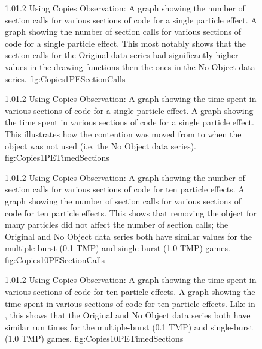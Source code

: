\begin{figure}
\addtocounter{figure}{-1}

	\vspace{-1.5cm}
	{1.0}{1.2}
	{Using Copies Observation: A graph showing the number of section calls for various sections of code for a single particle effect.}
	{A graph showing the number of section calls for various sections of code for a single particle effect. This most notably shows that the section calls for the Original data series had significantly higher values in the drawing functions then the ones in the No Object data series.}
	{fig:Copies1PESectionCalls}

	{1.0}{1.2}
	{Using Copies Observation: A graph showing the time spent in various sections of code for a single particle effect.}
	{A graph showing the time spent in various sections of code for a single particle effect. This illustrates how the contention was moved from  to  when the  object was not used (i.e. the No Object data series).}
	{fig:Copies1PETimedSections}

\end{figure}

\begin{figure}
\addtocounter{figure}{-1}

	\vspace{-1.5cm}
	{1.0}{1.2}
	{Using Copies Observation: A graph showing the number of section calls for various sections of code for ten particle effects.}
	{A graph showing the number of section calls for various sections of code for ten particle effects. This shows that removing the  object for many particles did not affect the number of section calls; the Original and No Object data series both have similar values for the multiple-burst (0.1 TMP) and single-burst (1.0 TMP) games.}
	{fig:Copies10PESectionCalls}

	{1.0}{1.2}
	{Using Copies Observation: A graph showing the time spent in various sections of code for ten particle effects.}
	{A graph showing the time spent in various sections of code for ten particle effects. Like in , this shows that the Original and No Object data series both have similar run times for the multiple-burst (0.1 TMP) and single-burst (1.0 TMP) games.}
	{fig:Copies10PETimedSections}

\end{figure}

